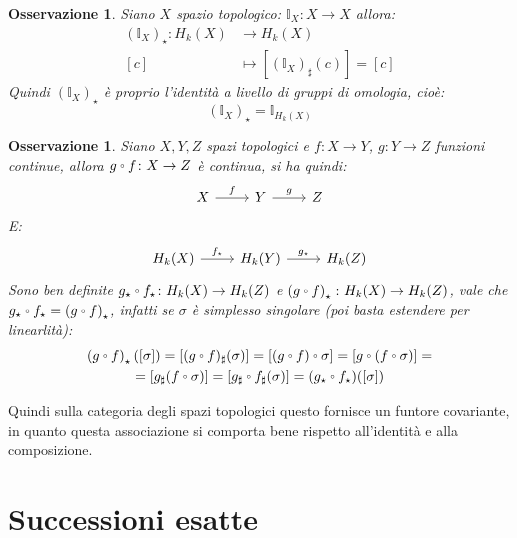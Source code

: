 \documentclass[10pt, twoside=false, x11names]{scrbook}
\newtheorem{osservation}[theorem]{Osservazione}
\newcommand{\Id}[1][]{\mathbb{I}_#1}
\let\latexcirc=\circ
\newcommand{\ccirc}{\mathbin{\mathchoice
  {\xcirc\scriptstyle}
  {\xcirc\scriptstyle}
  {\xcirc\scriptscriptstyle}
  {\xcirc\scriptscriptstyle}
}}
\newcommand{\xcirc}[1]{\vcenter{\hbox{$#1\latexcirc$}}}
\let\circ\ccirc
\begin{document}

\begin{osservation}
  Siano $ X $ spazio topologico:
  $ \Id{X} \colon X \to X $ allora:
  \begin{align*}
    \left(\Id{X}\right)_\star \colon H_k(X) & \to H_k(X) \\
    [c] & \mapsto [\left(\Id{X}\right)_\sharp (c)] = [c]
  \end{align*}
  Quindi $ \left(\Id{X}\right)_\star $ è proprio l'identità
  a livello di gruppi di omologia, cioè:
  \[
    \left(\Id{X}\right)_\star = \Id{H_k(X)}
  \]
\end{osservation}

\begin{osservation}
  Siano $ X, Y, Z $ spazi topologici e $ f \colon X \to Y $,
  $ g \colon Y \to Z $ funzioni continue, allora $ g \circ f \colon X \to Z $
  è continua, si ha quindi:
  \[
    \begin{tikzcd}
      X \arrow{r}{f} &  Y  \arrow{r}{g} & Z
    \end{tikzcd}
  \]
  E:
  \[
    \begin{tikzcd}
      H_k(X) \arrow{r}{f_\star} &  H_k(Y) \arrow{r}{g_\star} & H_k(Z)
    \end{tikzcd}
  \]
  Sono ben definite $ g_\star \circ f_\star \colon H_k(X) \to H_k(Z) $ e
  $ \left(g \circ f\right)_\star \colon H_k(X) \to H_k(Z) $, vale che
  $ g_\star \circ f_\star =  \left(g \circ f\right)_\star $, infatti se $ \sigma $ è
  simplesso singolare (poi basta estendere per linearlità):
  \begin{gather*}
    \left(g \circ f\right)_\star ([\sigma]) = [ (g \circ f)_\sharp (\sigma) ] = [ (g \circ f) \circ \sigma ] =  [ g \circ (f \circ \sigma) ] = \\
    = [ g_\sharp (f \circ \sigma)] = [ g_\sharp \circ f_\sharp (\sigma) ] = (g_\star \circ f_\star) ([\sigma])
  \end{gather*}
\end{osservation}
Quindi sulla categoria degli spazi topologici questo
fornisce un funtore covariante, in quanto questa associazione
si comporta bene rispetto all'identità e alla composizione.

\section{Successioni esatte}
\end{document}
